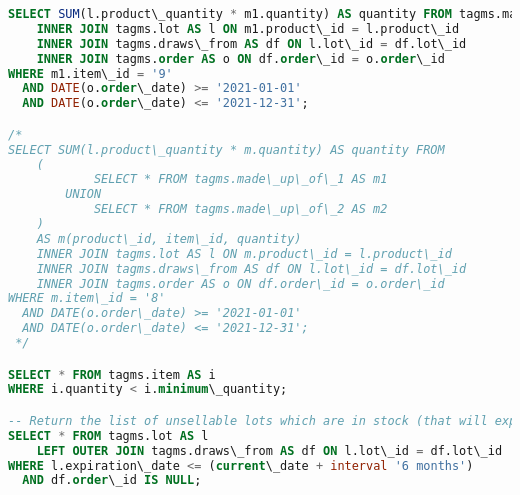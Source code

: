 \begin{lstlisting}[language=SQL,
keywordstyle=\color{blue},
stringstyle=\color{mauve},
showstringspaces=false,
basicstyle=\ttfamily\footnotesize]
SELECT SUM(l.product\_quantity * m1.quantity) AS quantity FROM tagms.made\_up\_of\_1 AS m1
    INNER JOIN tagms.lot AS l ON m1.product\_id = l.product\_id
    INNER JOIN tagms.draws\_from AS df ON l.lot\_id = df.lot\_id
    INNER JOIN tagms.order AS o ON df.order\_id = o.order\_id
WHERE m1.item\_id = '9'
  AND DATE(o.order\_date) >= '2021-01-01'
  AND DATE(o.order\_date) <= '2021-12-31';

/*
SELECT SUM(l.product\_quantity * m.quantity) AS quantity FROM
    (
            SELECT * FROM tagms.made\_up\_of\_1 AS m1
        UNION
            SELECT * FROM tagms.made\_up\_of\_2 AS m2
    )
    AS m(product\_id, item\_id, quantity)
    INNER JOIN tagms.lot AS l ON m.product\_id = l.product\_id
    INNER JOIN tagms.draws\_from AS df ON l.lot\_id = df.lot\_id
    INNER JOIN tagms.order AS o ON df.order\_id = o.order\_id
WHERE m.item\_id = '8'
  AND DATE(o.order\_date) >= '2021-01-01'
  AND DATE(o.order\_date) <= '2021-12-31';
 */

SELECT * FROM tagms.item AS i
WHERE i.quantity < i.minimum\_quantity;

-- Return the list of unsellable lots which are in stock (that will expire in less than 6 months)
SELECT * FROM tagms.lot AS l
    LEFT OUTER JOIN tagms.draws\_from AS df ON l.lot\_id = df.lot\_id
WHERE l.expiration\_date <= (current\_date + interval '6 months')
  AND df.order\_id IS NULL;

\end{lstlisting}

